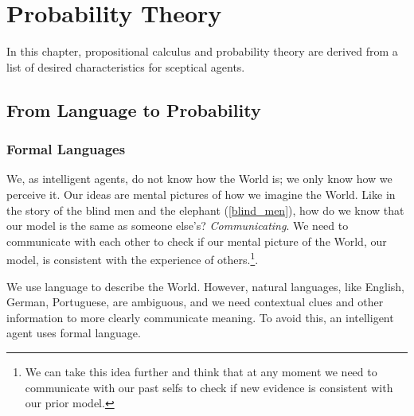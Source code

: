 \chapter{Probability Theory}\label{ch:probability}

In this chapter, propositional calculus and probability theory are derived from a list of desired characteristics for sceptical agents.

\section{From Language to Probability}\label{sec:language_probability}
\subsection{Formal Languages} We, as intelligent agents, do not know how the World is; we only know how we perceive it. Our ideas are mental pictures of how we imagine the World. Like in the story of the blind men and the elephant (\cref{blind_men}), how do we know that our model is the same as someone else's? \emph{Communicating}. We need to communicate with each other to check if our mental picture of the World, our model, is consistent with the experience of others.\footnote{We can take this idea further and think that at any moment we need to communicate with our past selfs to check if new evidence is consistent with our prior model.}.

We use language to describe the World. However, natural languages, like English, German, Portuguese, are ambiguous, and we need contextual clues and other information to more clearly communicate meaning. To avoid this, an intelligent agent uses formal language.


